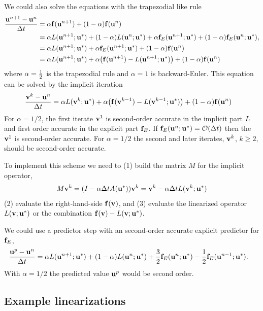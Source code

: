 We could also solve the equations with the trapezodial like rule 
\begin{align*}
{ \mathbf{ u}^{n+1} - \mathbf{ u}^n \over {\Delta t}} &= \alpha \mathbf{ f}(\mathbf{ u}^{n+1}) + (1-\alpha) \mathbf{ f}(\mathbf{ u}^n) \\
          &= \alpha L(\mathbf{ u}^{n+1}; \mathbf{ u}^*) + (1-\alpha)L(\mathbf{ u}^{n}; \mathbf{ u}^*)
                                   +\alpha \mathbf{ f}_E(\mathbf{ u}^{n+1}; \mathbf{ u}^*) + (1-\alpha) \mathbf{ f}_E(\mathbf{ u}^n; \mathbf{ u}^*), \\
          &= \alpha L(\mathbf{ u}^{n+1}; \mathbf{ u}^*) +\alpha \mathbf{ f}_E(\mathbf{ u}^{n+1}; \mathbf{ u}^*) + (1-\alpha) \mathbf{ f}(\mathbf{ u}^n) \\
          &= \alpha L(\mathbf{ u}^{n+1}; \mathbf{ u}^*) +\alpha\big( \mathbf{ f}(\mathbf{ u}^{n+1}) -L(\mathbf{ u}^{n+1}; \mathbf{ u}^*) \big) + (1-\alpha) \mathbf{ f}(\mathbf{ u}^n) 
\end{align*} 
where $\alpha={1\over2}$ is the trapezodial rule and $\alpha=1$ is backward-Euler.
This equation can be solved by the implicit iteration 
\begin{align*}
{ \mathbf{ v}^k - \mathbf{ u}^n \over {\Delta t}} &=  \alpha L(\mathbf{ v}^{k}; \mathbf{ u}^*) +\alpha\big( \mathbf{ f}(\mathbf{ v}^{k-1}) -L(\mathbf{ v}^{k-1}; \mathbf{ u}^*) \big) + (1-\alpha) \mathbf{ f}(\mathbf{ u}^n) 
\end{align*}  
% 
For $\alpha=1/2$, the first iterate $\mathbf{ v}^1$ is second-order accurate in the implicit part $L$ and first order accurate in the
explicit part $\mathbf{ f}_E$. If $\mathbf{ f}_E(\mathbf{ u}^n;\mathbf{ u}^*)={\mathcal O}({\Delta t})$ then the $\mathbf{ v}^1$ is second-order accurate. 
For $\alpha=1/2$ the second and later iterates, $\mathbf{ v}^k$, $k\ge 2$, should be second-order accurate. 


To implement this scheme we need to (1) build the matrix $M$ for the implicit operator,
\begin{align*}
  M \mathbf{ v}^k = (I - \alpha{\Delta t} A(\mathbf{ u}^*) )\mathbf{ v}^k = \mathbf{ v}^{k}-\alpha{\Delta t} L(\mathbf{ v}^{k}; \mathbf{ u}^*)
\end{align*} 
(2) evaluate the right-hand-side $\mathbf{ f}(\mathbf{ v})$, and (3) evaluate the linearized operator $L(\mathbf{ v}; \mathbf{ u}^*)$ or
the combination $\mathbf{ f}(\mathbf{ v}) -L(\mathbf{ v}; \mathbf{ u}^*)$. 




We could use a predictor step with an second-order accurate explicit predictor for $\mathbf{ f}_E$, 
\begin{align*}
{ \mathbf{ u}^{p} - \mathbf{ u}^n \over {\Delta t}}
          &= \alpha L(\mathbf{ u}^{n+1}; \mathbf{ u}^*) + (1-\alpha)L(\mathbf{ u}^{n}; \mathbf{ u}^*)
                                   + \frac{3}{2} \mathbf{ f}_E(\mathbf{ u}^{n}; \mathbf{ u}^*) - {1\over2} \mathbf{ f}_E(\mathbf{ u}^{n-1}; \mathbf{ u}^*) .
\end{align*}
With $\alpha=1/2$ the predicted value $\mathbf{ u}^{p}$ would be second order. 



\subsection{Example linearizations}


